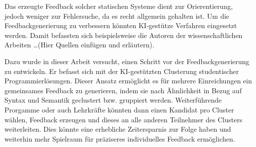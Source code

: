 Das erzeugte Feedback solcher statischen Systeme dient zur Orierentierung, jedoch weniger zur Fehlersuche, da es recht allgemein gehalten ist. Um die Feedbackgenerierung zu verbessern könnten KI-gestütze Verfahren eingesetzt werden. Damit befassten sich beispielsweise die Autoren der wissenschaftlichen Arbeiten \dots (Hier Quellen einfügen und erläutern).

Dazu wurde in dieser Arbeit versucht, einen Schritt vor der Feedbackgenerierung zu entwickeln. Er befasst sich mit der KI-gestützten Clusterung studentischer Programmierlösungen. Dieser Ansatz ermöglicht es für mehrere Einreichungen ein gemeinsames Feedback zu generieren, indem sie nach Ähnlichkeit in Bezug auf Syntax und Semantik geclustert bzw. gruppiert werden. Weiterführende Prorgamme oder auch Lehrkräfte könnten dann einen Kandidat pro Cluster wählen, Feedback erzeugen und dieses an alle anderen Teilnehmer des Clusters weiterleiten. Dies könnte eine erhebliche Zeitersparnis zur Folge haben und weiterhin mehr Spielraum für präziseres individuelles Feedback ermöglichen. 